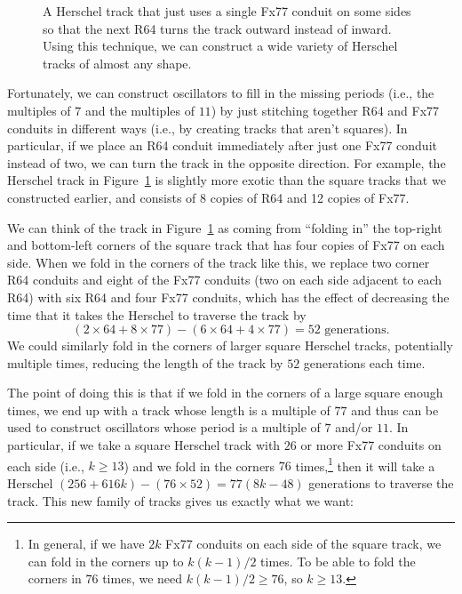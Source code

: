 \begin{figure}[!htb]
	\centering
	\caption{A Herschel track that just uses a single Fx77 conduit on some sides so that the next R64 turns the track outward instead of inward. Using this technique, we can construct a wide variety of Herschel tracks of almost any shape.}\label{fig:herschel_track_2}
\end{figure}

Fortunately, we can construct oscillators to fill in the missing periods (i.e., the multiples of $7$ and the multiples of $11$) by just stitching together R64 and Fx77 conduits in different ways (i.e., by creating tracks that aren't squares). In particular, if we place an R64 conduit immediately after just one Fx77 conduit instead of two, we can turn the track in the opposite direction. For example, the Herschel track in Figure~\ref{fig:herschel_track_2} is slightly more exotic than the square tracks that we constructed earlier, and consists of 8 copies of R64 and 12 copies of Fx77.

We can think of the track in Figure~\ref{fig:herschel_track_2} as coming from ``folding in'' the top-right and bottom-left corners of the square track that has four copies of Fx77 on each side. When we fold in the corners of the track like this, we replace two corner R64 conduits and eight of the Fx77 conduits (two on each side adjacent to each R64) with six R64 and four Fx77 conduits, which has the effect of decreasing the time that it takes the Herschel to traverse the track by
\[
(2 \times 64 + 8 \times 77) - (6 \times 64 + 4 \times 77) = 52 \text{ generations.}
\]
We could similarly fold in the corners of larger square Herschel tracks, potentially multiple times, reducing the length of the track by $52$ generations each time.

The point of doing this is that if we fold in the corners of a large square enough times, we end up with a track whose length is a multiple of $77$ and thus can be used to construct oscillators whose period is a multiple of $7$ and/or $11$. In particular, if we take a square Herschel track with $26$ or more Fx77 conduits on each side (i.e., $k \geq 13$) and we fold in the corners $76$ times,\footnote{In general, if we have $2k$ Fx77 conduits on each side of the square track, we can fold in the corners up to $k(k-1)/2$ times. To be able to fold the corners in $76$ times, we need $k(k-1)/2 \geq 76$, so $k \geq 13$.} then it will take a Herschel $(256 + 616k) - (76 \times 52) = 77(8k - 48)$ generations to traverse the track. This new family of tracks gives us exactly what we want:

